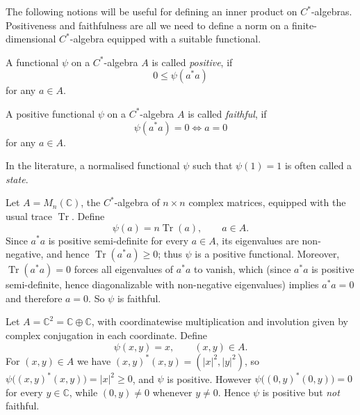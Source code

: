 The following notions will be useful for defining an inner product on
\(C^{*}\)-algebras. Positiveness and faithfulness are all we need to
define a norm on a finite-dimensional \(C^{*}\)-algebra equipped with
a suitable functional.

\begin{definition}
    \label{def:positive-functional}
    A functional \( \psi \) on a \(C^{*}\)-algebra \( A \) is called
    \emph{positive}, if
    \[
        0\leq \psi(a^{*}a)
    \]
    for any \( a \in A \).
\end{definition}

\begin{definition}
    \label{def:faithful-functional}
    A positive functional \( \psi \) on a \(C^{*}\)-algebra \( A \) is
    called \emph{faithful}, if
    \[
        \psi(a^{*}a) = 0 \Leftrightarrow a = 0
    \]
    for any \( a \in A \).
\end{definition}

\begin{remark}
    \label{rem:state-terminology}
    In the literature, a normalised functional \( \psi \) such that
    \( \psi(1) = 1 \) is often called a \emph{state}.
\end{remark}

\begin{example}
    \label{example:trace-functional}
    Let \( A = M_{n}(\mathbb{C}) \), the \(C^{*}\)-algebra of \( n \times n \)
    complex matrices, equipped with the usual trace \( \operatorname{Tr} \).
    Define
    \[
        \psi(a) = n \operatorname{Tr}(a), \qquad a \in A.
    \]
    Since \( a^{*}a \) is positive semi-definite for every \( a \in A \), its
    eigenvalues are non-negative, and hence \(
    \operatorname{Tr}(a^{*}a) \geq 0 \);
    thus \( \psi \) is a positive functional. Moreover, \(
    \operatorname{Tr}(a^{*}a) = 0 \)
    forces all eigenvalues of \( a^{*}a \) to vanish, which (since \( a^{*}a \)
        is positive semi-definite, hence diagonalizable with non-negative
    eigenvalues) implies \( a^{*}a = 0 \) and therefore \( a = 0 \).
    So \( \psi \)
    is faithful.
\end{example}

\begin{example}
    \label{example:not-faithful-functional}
    Let \( A = \mathbb{C}^{2} = \mathbb{C} \oplus \mathbb{C} \), with
    coordinatewise multiplication and involution given by complex
    conjugation in each coordinate. Define
    \[
        \psi(x,y) = x, \qquad (x,y) \in A.
    \]
    For \( (x,y) \in A \) we have \( (x,y)^{*}(x,y) = (|x|^{2}, |y|^{2}) \),
    so \( \psi\big((x,y)^{*}(x,y)\big) = |x|^{2} \geq 0 \), and \( \psi \) is
    positive. However \( \psi\big((0,y)^{*}(0,y)\big) = 0 \) for every
    \( y \in \mathbb{C} \), while \( (0,y) \neq 0 \) whenever \( y \neq 0 \).
    Hence \( \psi \) is positive but \emph{not} faithful.
\end{example}

